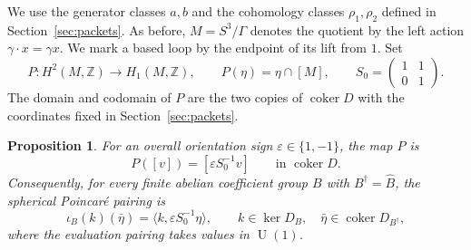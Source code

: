 \documentclass[11pt,a4paper,reqno]{amsart}
\theoremstyle{plain}
\newtheorem{proposition}[theorem]{Proposition}
\theoremstyle{definition}
\theoremstyle{remark}
\numberwithin{equation}{section}
\newcommand{\UU}{\operatorname{U}}
\newcommand{\ZZ}{\mathbb Z}
\newcommand{\pair}[2]{\langle #1,#2\rangle}
\DeclareMathOperator{\coker}{coker}
\begin{document}
We use the generator classes $a,b$ and the cohomology classes $\rho_1,\rho_2$ defined in Section~\ref{sec:packets}. As before, $M=S^3/\Gamma$ denotes the quotient by the left action $\gamma\cdot x=\gamma x$. We mark a based loop by the endpoint of its lift from $1$. Set
\[
P\colon H^2(M,\ZZ)\longrightarrow H_1(M,\ZZ),\qquad
P(\eta)=\eta\cap[M],\qquad
S_0=\begin{pmatrix}1&1\\0&1\end{pmatrix}.
\]
The domain and codomain of $P$ are the two copies of $\coker D$ with the coordinates fixed in Section~\ref{sec:packets}.

\begin{proposition}\label{prop:poincare}
For an overall orientation sign $\varepsilon\in\{1,-1\}$, the map $P$ is
\begin{equation}\label{eq:PD-integral}
P([v])=[\varepsilon S_0^{-1}v]\qquad\text{in }\coker D.
\end{equation}
Consequently, for every finite abelian coefficient group $B$ with $B^\dagger=\widehat B$, the spherical Poincar\'e pairing is
\begin{equation}\label{eq:PD}
\iota_B(k)(\bar\eta)=\pair{k}{\varepsilon S_0^{-1}\eta},
\qquad k\in\ker D_B,\quad
\bar\eta\in\coker D_{B^\dagger},
\end{equation}
where the evaluation pairing takes values in $\UU(1)$.
\end{proposition}
\end{document}
